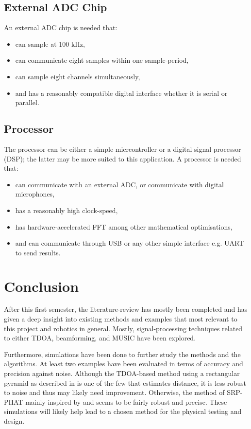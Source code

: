 \documentclass[notitlepage]{report}
\begin{document}
\section{External ADC Chip}

An external ADC chip is needed that:
\begin{itemize}
	\item can sample at 100 \si{kHz},
	\item can communicate eight samples within one sample-period,
	\item can sample eight channels simultaneously,
	\item and has a reasonably compatible digital interface whether it is serial or parallel.
\end{itemize}

\section{Processor}

The processor can be either a simple micrcontroller or a digital signal processor (DSP); the latter may be more suited to this application. A processor is needed that:
\begin{itemize}
	\item can communicate with an external ADC, or communicate with digital microphones,
	\item has a reasonably high clock-speed,
	\item has hardware-accelerated FFT among other mathematical optimisations,
	\item and can communicate through USB or any other simple interface e.g. UART to send results.
\end{itemize}

\chapter{Conclusion}

After this first semester, the literature-review has mostly been completed and has given a deep insight into existing methods and examples that most relevant to this project and robotics in general. Mostly, signal-processing techniques related to either TDOA, beamforming, and MUSIC have been explored.

Furthermore, simulations have been done to further study the methods and the algorithms. At least two examples have been evaluated in terms of accuracy and precision against noise. Although the TDOA-based method using a rectangular pyramid as described in \cite{chen_sound_2019} is one of the few that estimates distance, it is less robust to noise and thus may likely need improvement. Otherwise, the method of SRP-PHAT mainly inspired by \cite{valin_localization_2004} and \cite{valin_robust_2007} seems to be fairly robust and precise. These simulations will likely help lead to a chosen method for the physical testing and design.
\end{document}
